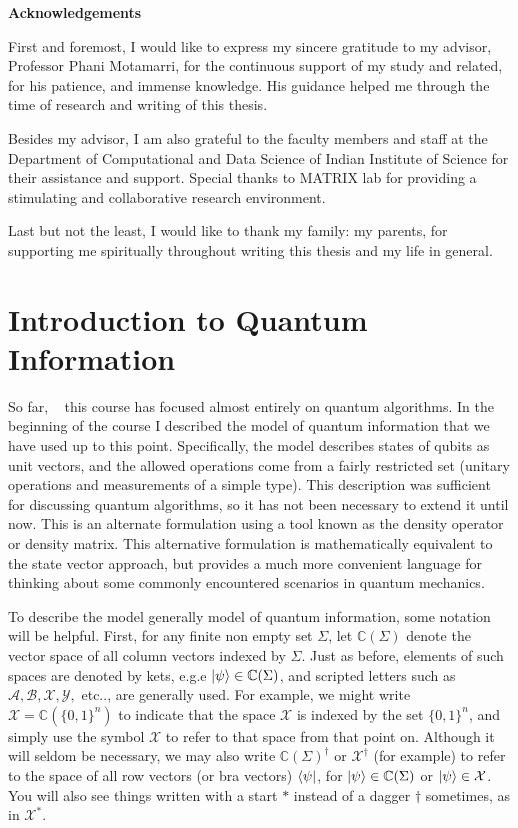 \documentclass[12pt, oneside]{book}
\theoremstyle{definition}
\theoremstyle{definition}
\theoremstyle{remark}
\newcommand{\acknowledgementsname}{Acknowledgements}
\newenvironment{Acknowledgements}{%
\clearpage
\null\vfill
\begin{center}%
    \bfseries \acknowledgementsname
\end{center}}%
{\vfill\null}
\begin{document}
\begin{Acknowledgements}
First and foremost, I would like to express my sincere gratitude to my advisor,
Professor Phani Motamarri, for the continuous support of my study and related, for
his patience, and immense knowledge.
His guidance helped me through the time of research and writing of this thesis.

Besides my advisor, I am also grateful to the faculty members and staff at the
Department of Computational and Data Science of Indian Institute of Science for
their assistance and support. Special thanks to MATRIX lab for providing a stimulating
and collaborative research environment.

Last but not the least, I would like to thank my family: my parents,
for supporting me spiritually throughout writing this thesis and my life in general.
\end{Acknowledgements}

\tableofcontents
\mainmatter
\chapter{Introduction to Quantum Information}
So far, ~\cite{nielsen2010quantum} this course has focused almost entirely on quantum algorithms. In the beginning of the course I described the model of quantum information that we have used up to this point. Specifically, the model describes states of qubits as unit vectors, and the allowed operations come from a fairly restricted set (unitary operations and measurements of a simple type). This description was sufficient for discussing quantum algorithms, so it has not been necessary to extend it until now. This is an alternate formulation using a tool known as the density operator or density matrix. This alternative formulation is mathematically equivalent to the state vector approach, but provides a much more convenient language for thinking about some commonly encountered scenarios in quantum mechanics.

To describe the model generally model of quantum information, some notation will be helpful. First, for any finite non empty set $\Sigma$, let $\mathbb{C}(\Sigma)$ denote the vector space of all column vectors indexed by $\Sigma$. Just as before, elements of such spaces are denoted by kets, e.g.e $\ket{\psi} \in \mathbb{C}(\Sigma)$, and scripted letters such as $\mathcal{A},\mathcal{B},\mathcal{X},\mathcal{Y},$ etc.., are generally used. For example, we might write $\mathcal{X}=\mathbb{C}(\{0,1\}^n)$ to indicate that the space $\mathcal{X}$ is indexed by the set $\{0,1\}^n$, and simply use the symbol $\mathcal{X}$ to refer to that space from that point on. Although it will seldom be necessary, we may also write $\mathbb{C}(\Sigma)^{\dagger}$ or $\mathcal{X}^{\dagger}$ (for example) to refer to the space of all row vectors (or bra vectors) $\bra{\psi}$, for $\ket{\psi} \in \mathbb{C}(\Sigma)$ or $\ket{\psi} \in \mathcal{X}$. You will also see things written with a  start $*$ instead of a dagger $\dagger$ sometimes, as in $\mathcal{X}^*$.
\end{document}
